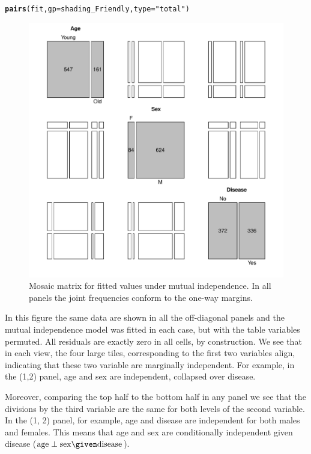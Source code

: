 \documentclass[11pt]{book}\usepackage[]{graphicx}\usepackage[]{color}
\makeatletter
\newcommand{\hlstr}[1]{\textcolor[rgb]{0.192,0.494,0.8}{#1}}%
\newcommand{\hlstd}[1]{\textcolor[rgb]{0.345,0.345,0.345}{#1}}%
\newcommand{\hlkwc}[1]{\textcolor[rgb]{0.333,0.667,0.333}{#1}}%
\newcommand{\hlkwd}[1]{\textcolor[rgb]{0.737,0.353,0.396}{\textbf{#1}}}%
\newenvironment{kframe}{%
 \def\at@end@of@kframe{}%
 \ifinner\ifhmode%
  \def\at@end@of@kframe{\end{minipage}}%
  \begin{minipage}{\columnwidth}%
 \fi\fi%
 \def\FrameCommand##1{\hskip\@totalleftmargin \hskip-\fboxsep
 \colorbox{shadecolor}{##1}\hskip-\fboxsep
     \hskip-\linewidth \hskip-\@totalleftmargin \hskip\columnwidth}%
 \MakeFramed {\advance\hsize-\width
   \@totalleftmargin\z@ \linewidth\hsize
   \@setminipage}}%
 {\par\unskip\endMakeFramed%
 \at@end@of@kframe}
\newenvironment{knitrout}{}{} %
\renewenvironment{knitrout}{\small\renewcommand{\baselinestretch}{.85}}{} %
\makeatother
\begin{document}
\begin{knitrout}
\color{fgcolor}\begin{kframe}
\begin{alltt}
\hlkwd{pairs}\hlstd{(fit,} \hlkwc{gp}\hlstd{=shading_Friendly,} \hlkwc{type}\hlstd{=}\hlstr{"total"}\hlstd{)}
\end{alltt}
\end{kframe}\begin{figure}[!htb]


\centerline{\includegraphics[width=.8\textwidth]{ch05/fig/struc-mos3} }

\caption[Mosaic matrix for fitted values under mutual independence]{Mosaic matrix for fitted values under mutual independence.  In all panels the joint frequencies conform to the one-way margins.\label{fig:struc-mos3}}
\end{figure}


\end{knitrout}

In this figure the same data are shown in all the off-diagonal panels
and the mutual independence model was fitted in each case, but with the
table variables permuted.  All residuals are exactly zero in all cells,
by construction.
We see that in each view, the four large
tiles, corresponding to the first two variables align, indicating
that these two variable are marginally independent.
For example, in the (1,2) panel, age and sex are independent, collapsed
over disease.

Moreover, comparing the top half to the bottom half
in any panel we see that the divisions by the third variable
are the same for both levels of the second variable.
In the (1, 2) panel, for example, age and disease are independent 
for both males and females.
This means that age and sex are conditionally independent
given disease ($\mathrm{age} \perp \mathrm{sex} \given \mathrm{disease}$).
\end{document}
